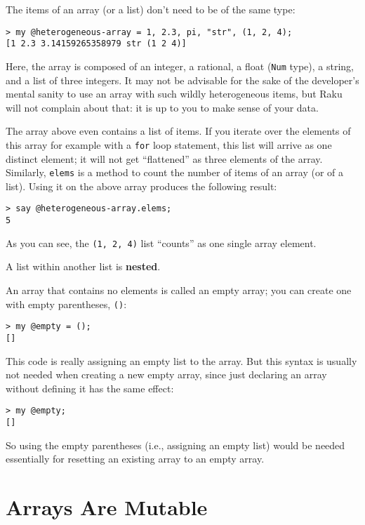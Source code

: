 The items of an array (or a list) don't need to be of the 
same type:

\begin{verbatim}
> my @heterogeneous-array = 1, 2.3, pi, "str", (1, 2, 4);
[1 2.3 3.14159265358979 str (1 2 4)]
\end{verbatim}

Here, the array is composed of an integer, a rational, a 
float ({\tt Num} type), a string, and a list of three integers. 
It may not be advisable for the sake of the developer's 
mental sanity to use an array with such wildly heterogeneous 
items, but Raku will not complain about that: it is up 
to you to make sense of your data.

The array above even contains a list of items. If you iterate 
over the elements of this array for example with a {\tt for} 
loop statement, this list will arrive as one distinct element; 
it will not get ``flattened'' as three elements 
of the array. Similarly, {\tt elems} is a method to 
count the number of items of an array (or of a list). 
Using it on the above array produces the following result:

\begin{verbatim}
> say @heterogeneous-array.elems;
5
\end{verbatim}
%

As you can see, the \verb'(1, 2, 4)' list ``counts'' 
as one single array element.

A list within another list is {\bf nested}.

An array that contains no elements is
called an empty array; you can create one with empty
parentheses, \verb"()":
\begin{verbatim}
> my @empty = ();
[]
\end{verbatim}

This code is really assigning an empty list to the array. But 
this syntax is usually not needed when creating a new empty array, 
since just declaring an array without defining it has the same 
effect:

\begin{verbatim}
> my @empty;
[]
\end{verbatim}

So using the empty parentheses (i.e., assigning an empty list) 
would be needed essentially for resetting an existing array to 
an empty array.


\section{Arrays Are Mutable}
\label{mutable}


